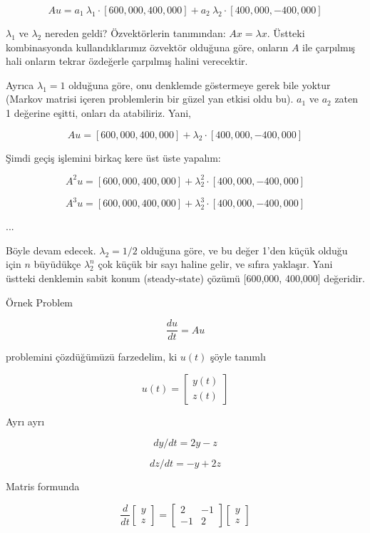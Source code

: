 \documentclass[12pt,fleqn]{article}\usepackage{../../common}
\begin{document}
$$ Au = 
a_1 \ \lambda_1 \cdot [600,000, 400,000] + 
a_2 \ \lambda_2 \cdot [400,000, -400,000] $$

$\lambda_1$ ve $\lambda_2$ nereden geldi? Özvektörlerin tanımından: $Ax =
\lambda x$. Üstteki 
kombinasyonda kullandıklarımız özvektör olduğuna göre, onların $A$ ile
çarpılmış hali onların tekrar özdeğerle çarpılmış halini verecektir. 

Ayrıca $\lambda_1=1$ olduğuna göre, onu denklemde göstermeye gerek bile
yoktur (Markov matrisi içeren problemlerin bir güzel yan etkisi oldu
bu). $a_1$ ve $a_2$ zaten 1 değerine eşitti, onları da atabiliriz. Yani,

$$ Au = 
[600,000, 400,000] + 
\lambda_2 \cdot [400,000, -400,000] $$

Şimdi geçiş işlemini birkaç kere üst üste yapalım:

$$ A^2u = 
[600,000, 400,000] + 
\lambda_2^2 \cdot [400,000, -400,000] $$

$$ A^3u = 
[600,000, 400,000] + 
\lambda_2^3 \cdot [400,000, -400,000] $$

...

Böyle devam edecek. $\lambda_2=1/2$ olduğuna göre, ve bu değer 1'den küçük
olduğu için $n$ büyüdükçe $\lambda_2^n$ çok küçük bir sayı haline gelir, ve
sıfıra yaklaşır. Yani üstteki denklemin sabit konum (steady-state)
çözümü [600,000, 400,000] değeridir.

Örnek Problem

$$ 
\frac{du}{dt} = Au
 $$

problemini çözdüğümüzü farzedelim, ki $u(t)$ şöyle tanımlı

$$ 
u(t) =
\left[\begin{array}{r}
y(t) \\
z(t)
\end{array}\right]
 $$

Ayrı ayrı

$$ dy/dt = 2y - z $$

$$ dz/dt = -y + 2z $$

Matris formunda

$$ 
\frac{d}{dt}
\left[\begin{array}{r}
y \\
z
\end{array}\right]=
\left[\begin{array}{rr}
2 & -1 \\
-1 & 2
\end{array}\right]
\left[\begin{array}{r}
y \\
z
\end{array}\right]
 $$
\end{document}
